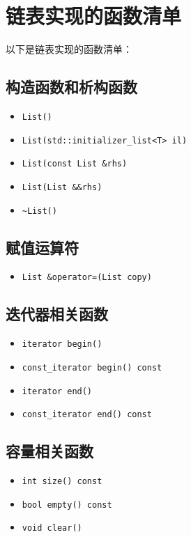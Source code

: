 \documentclass[UTF8]{ctexart}
\begin{document}
\pagestyle{fancy}
\fancyhead{}

\section{链表实现的函数清单}

以下是链表实现的函数清单：

\subsection{构造函数和析构函数}
\begin{itemize}
  \item \texttt{List()}
  \item \texttt{List(std::initializer\_list<T> il)}
  \item \texttt{List(const List \&rhs)}
  \item \texttt{List(List \&\&rhs)}
  \item \texttt{\textasciitilde List()}
\end{itemize}

\subsection{赋值运算符}
\begin{itemize}
  \item \texttt{List \&operator=(List copy)}
\end{itemize}

\subsection{迭代器相关函数}
\begin{itemize}
  \item \texttt{iterator begin()}
  \item \texttt{const\_iterator begin() const}
  \item \texttt{iterator end()}
  \item \texttt{const\_iterator end() const}
\end{itemize}

\subsection{容量相关函数}
\begin{itemize}
  \item \texttt{int size() const}
  \item \texttt{bool empty() const}
  \item \texttt{void clear()}
\end{itemize}
\end{document}
